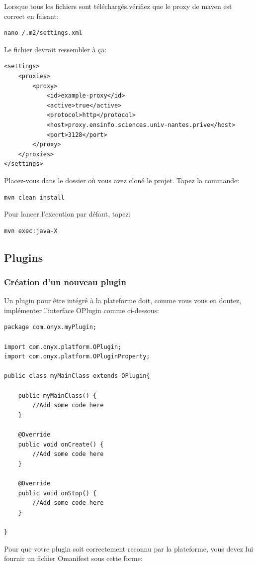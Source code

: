 Lorsque tous les fichiers sont téléchargés,vérifiez que le proxy de maven est correct en faisant:
\begin{verbatim}
nano /.m2/settings.xml
\end{verbatim}

Le fichier devrait ressembler à ça:
\begin{verbatim}
<settings>
    <proxies>
        <proxy>
            <id>example-proxy</id>
            <active>true</active>
            <protocol>http</protocol>
            <host>proxy.ensinfo.sciences.univ-nantes.prive</host>
            <port>3128</port>
        </proxy>
    </proxies>
</settings>
\end{verbatim}

Placez-vous dans le dossier où vous avez cloné le projet. 
Tapez la commande:
\begin{verbatim}
mvn clean install
\end{verbatim}

Pour lancer l'execution par défaut, tapez:
\begin{verbatim}
mvn exec:java-X
\end{verbatim}

\newpage
\subsection{Plugins}

\subsubsection{Création d'un nouveau plugin}

Un plugin pour être intégré à la plateforme doit, comme vous vous en doutez, implémenter l'interface OPlugin comme ci-dessous:
\begin{verbatim}
package com.onyx.myPlugin;

import com.onyx.platform.OPlugin;
import com.onyx.platform.OPluginProperty;

public class myMainClass extends OPlugin{

    public myMainClass() {
        //Add some code here
    }

    @Override
    public void onCreate() {
        //Add some code here
    }

    @Override
    public void onStop() {
        //Add some code here
    }

}
\end{verbatim}

Pour que votre plugin soit correctement reconnu par la plateforme, vous devez lui fournir un fichier Omanifest sous cette forme:

